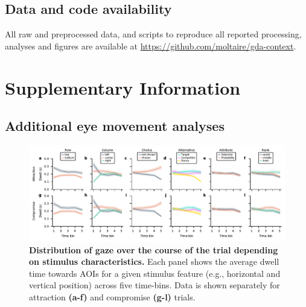\documentclass[11pt, a4paper]{article}
\begin{document}
\subsection*{Data and code availability}
All raw and preprocessed data, and scripts to reproduce all reported processing, analyses and figures are available at \hyperlink{https://github.com/moltaire/gda-context}{https://github.com/moltaire/gda-context}.

\renewcommand*{\bibfont}{\small}
\printbibliography
\newpage

\section*{Supplementary Information}
\label{sec:supplement}

\renewcommand{\thefigure}{S\arabic{figure}}
\setcounter{figure}{0} 

\renewcommand{\thetable}{S\arabic{table}}
\setcounter{table}{0} 


\subsection*{Additional eye movement analyses}
\label{sup:eye-movement-analyses}

\begin{figure}[ht!]
\begin{centering}
\includegraphics[scale=1]{../figures/S_gaze-data_timebinned_dwell.pdf}
\caption{\textbf{Distribution of gaze over the course of the trial depending on stimulus characteristics.} Each panel shows the average dwell time towards AOIs for a given stimulus feature (e.g., horizontal and vertical position) across five time-bins. Data is shown separately for attraction \textbf{(a-f)} and compromise \textbf{(g-l)} trials.}
\label{fig:dwell-data-timebinned}
\end{centering}
\end{figure}
\end{document}
